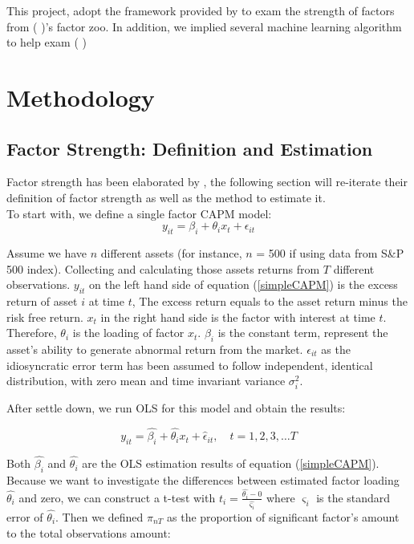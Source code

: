 \documentclass[12pt]{article}
\begin{document}
This project, adopt the framework provided by  to exam the strength of factors from (   )'s factor zoo. 
In addition, we implied several machine learning algorithm to help exam (                   )



	\section{Methodology}\label{Method}
	\subsection{Factor Strength: Definition and Estimation}\label{strength}
Factor strength has been elaborated by , the following section will re-iterate their definition of factor strength as well as the method to estimate it.\\
To start with, we define a single factor CAPM model:
\[  y_{it} = \beta_i + \theta_{i}x_t + \epsilon_{it}  \tag{1}\label{simpleCAPM} \]

Assume we have $n$ different assets (for instance, $n$ = 500 if using data from S\&P 500 index). 
Collecting and calculating those assets returns from $T$ different observations. 
$y_{it}$ on the left hand side of equation (\ref{simpleCAPM}) is the excess return of asset $i$ at time $t$, The excess return equals to the asset return minus the risk free return. 
$x_t$  in the right hand side is the factor with interest at time $t$. 
Therefore, $\theta_{i}$ is the loading of factor $x_{t}$. 
$\beta_{i}$ is the constant term, represent the asset's ability to generate abnormal return from the market. 
$\epsilon_{it}$ as the idiosyncratic error term has been assumed to follow independent, identical distribution, with zero mean and time invariant variance  $\sigma_i^2$.


After settle down, we run OLS for this model and obtain the results:

\[ y_{it} =\hat{\beta_i} + \hat{\theta_{i}}x_t + \hat{\epsilon}_{it}, \quad t = 1, 2, 3, \dots  T     \]

Both $\hat{\beta_i}$ and $\hat{\theta_{i}}$ are the OLS estimation results of equation  (\ref{simpleCAPM}). 
Because we want to investigate the differences between estimated factor loading $\hat{\theta_{i}}$ and zero, we can construct a t-test with $t_{i} = \frac{\hat{\theta_{i}} - 0}{\hat{\varsigma_{i}}}$ where $\varsigma_{i}$ is the standard error of $\hat{\theta_{i}}$.  
Then we defined $\pi_{nT}$ as the proportion of significant factor's amount to the total observations amount:
\end{document}
